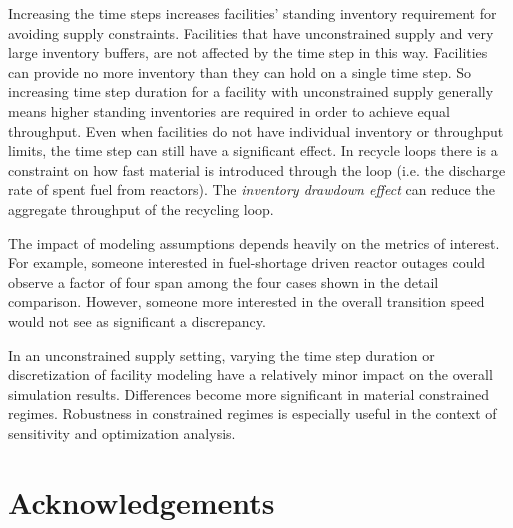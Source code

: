 \documentclass{style}
\begin{document}
Increasing the time steps increases facilities' standing inventory requirement
for avoiding supply constraints.  Facilities that have unconstrained supply
and very large inventory buffers, are not affected by the time step in this
way.  Facilities can provide no more inventory than they can hold on a single
time step.  So increasing time step duration for a facility with unconstrained
supply generally means higher standing inventories are required in order to
achieve equal throughput. Even when facilities do not have individual
inventory or throughput limits, the time step can still have a significant
effect. In recycle loops there is a constraint on how fast material is
introduced through the loop (i.e. the discharge rate of spent fuel from
reactors).  The \emph{inventory drawdown effect} can reduce the aggregate
throughput of the recycling loop.

The impact of modeling assumptions depends heavily on the metrics of interest.
For example, someone interested in fuel-shortage driven reactor outages could
observe a factor of four span among the four cases shown in the detail
comparison.  However, someone more interested in the overall transition speed
would not see as significant a discrepancy.

In an unconstrained supply setting, varying the time step duration or
discretization of facility modeling have a relatively minor impact on the
overall simulation results.  Differences become more significant in material
constrained regimes.  Robustness in constrained regimes is especially useful
in the context of sensitivity and optimization analysis.

\section{Acknowledgements}



\end{document}
